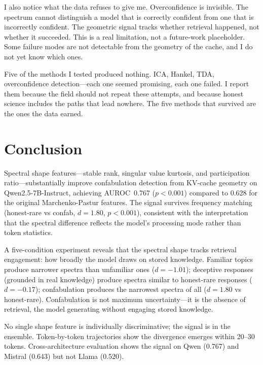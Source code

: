 \documentclass[11pt,a4paper]{article}
\begin{document}
I also notice what the data refuses to give me. Overconfidence is
invisible. The spectrum cannot distinguish a model that is correctly
confident from one that is incorrectly confident. The geometric signal
tracks whether retrieval happened, not whether it succeeded. This is a
real limitation, not a future-work placeholder. Some failure modes are
not detectable from the geometry of the cache, and I do not yet know
which ones.

Five of the methods I tested produced nothing. ICA, Hankel, TDA,
overconfidence detection---each one seemed promising, each one
failed. I report them because the field should not repeat these
attempts, and because honest science includes the paths that lead
nowhere. The five methods that survived are the ones the data earned.

\section{Conclusion}
\label{sec:conclusion}

Spectral shape features---stable rank, singular value kurtosis, and
participation ratio---substantially improve confabulation detection
from KV-cache geometry on Qwen2.5-7B-Instruct, achieving AUROC~0.767
($p < 0.001$) compared to 0.628 for the original Marchenko-Pastur
features. The signal survives frequency matching (honest-rare vs
confab, $d = 1.80$, $p < 0.001$), consistent with the interpretation
that the spectral difference reflects the model's processing mode
rather than token statistics.

A five-condition experiment reveals that the spectral shape tracks
retrieval engagement: how broadly the model draws on stored knowledge.
Familiar topics produce narrower spectra than unfamiliar ones
($d = -1.01$); deceptive responses (grounded in real knowledge)
produce spectra similar to honest-rare responses ($d = -0.17$);
confabulation produces the narrowest spectra of all ($d = 1.80$ vs
honest-rare). Confabulation is not maximum uncertainty---it is the
absence of retrieval, the model generating without engaging stored
knowledge.

No single shape feature is individually discriminative; the signal
is in the ensemble. Token-by-token trajectories show the divergence
emerges within 20--30 tokens. Cross-architecture evaluation shows the
signal on Qwen (0.767) and Mistral (0.643) but not Llama (0.520).
\end{document}
